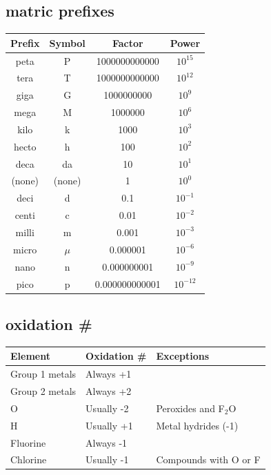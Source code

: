 \documentclass[a4paper,10pt,landscape]{scrartcl}
\begin{document}
\begin{multicols*}{3}
\subsection{matric prefixes}
\begin{tabular}{|c|c|c|c|}
\hline
\textbf{Prefix} & \textbf{Symbol} & \textbf{Factor} & \textbf{Power} \\ \hline
peta  & P   & 1000000000000  & $10^{15}$  \\ \hline
tera  & T   & 1000000000000  & $10^{12}$  \\ \hline
giga  & G   & 1000000000  & $10^{9}$  \\ \hline
mega  & M   & 1000000  & $10^{6}$  \\ \hline
kilo  & k   & 1000  & $10^{3}$  \\ \hline
hecto & h   & 100  & $10^{2}$  \\ \hline
deca  & da  & 10  & $10^{1}$  \\ \hline
(none) & (none) & 1  & $10^{0}$  \\ \hline
deci  & d   & 0.1  & $10^{-1}$ \\ \hline
centi & c   & 0.01  & $10^{-2}$ \\ \hline
milli & m   & 0.001  & $10^{-3}$ \\ \hline
micro & $\mu$ & 0.000001 & $10^{-6}$ \\ \hline
nano  & n   & 0.000000001  & $10^{-9}$ \\ \hline
pico  & p   & 0.000000000001  & $10^{-12}$ \\ \hline
\end{tabular}

\subsection{oxidation \#}
\begin{table}[H]
\centering
\begin{tabular}{|l|l|l|}
\hline
\textbf{Element}           & \textbf{Oxidation \#} & \textbf{Exceptions}                        \\ \hline
Group 1 metals             & Always +1                      &                                            \\ \hline
Group 2 metals             & Always +2                      &                                            \\ \hline
$\mathrm{O}$                     & Usually -2                     & Peroxides and F$_2$O            \\ \hline
$\mathrm{H}$                   & Usually +1                     & Metal hydrides (-1)             \\ \hline
Fluorine                   & Always -1                      &                                            \\ \hline
Chlorine                   & Usually -1                     & Compounds with O or F           \\ \hline
\end{tabular}
\label{table:oxidation_states}
\end{table}

\end{multicols*}
\end{document}
